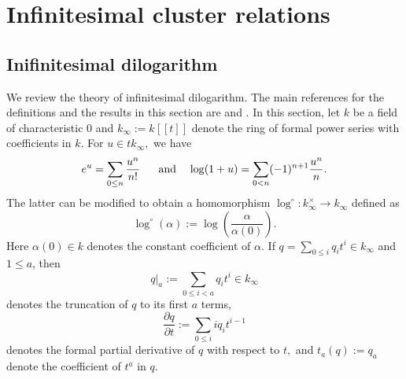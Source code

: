 \documentclass{amsart}
\theoremstyle{definition}
\numberwithin{equation}{subsection}
\begin{document}
\section{Infinitesimal cluster relations}



\subsection{Inifinitesimal dilogarithm}

We review the theory of infinitesimal dilogarithm. The main references for the definitions and the results in this section are \cite[]{inf-dilog} and \cite{u1}.  In this section, let $k$ be a field of characteristic 0 and $k_{\infty}:=k[[t]]$ denote the ring of formal power series with coefficients in $k.$ For $u \in tk_{\infty},$ we have 
$$
e^{u}=\sum _{0\leq n} \frac{u^n}{n!} \;\;\;\;\;\;{\rm and}\;\;\;\;
\log (1+u)=\sum _{0<n} (-1)^{n+1}\frac{u^n}{n}.
$$  
The latter can be modified to obtain a homomorphism 
$
\log^\circ : k_\infty^\times \to k_\infty
$
defined as 
\[
\log^\circ(\alpha) := \log\left(\frac{\alpha}{\alpha(0)}\right).
\]
Here $\alpha(0) \in k$ denotes the constant coefficient of $\alpha.$ 
If \( q = \sum_{0 \le i} q_i t^i \in k_\infty \) and \( 1 \le a \), then $$
q|_a := \sum_{0 \le i < a} q_i t^i \in k_{\infty}
$$
denotes the truncation of $q$ to its first \( a \) terms, 
\[\frac{\partial q}{\partial t}:=\sum _{0\leq i} iq_{i}t^{i-1}\]
denotes 
the formal partial derivative of $q$ with respect to $t,$  and \( t_a(q) := q_a \) denote the coefficient of $t^a$ in $q.$  
\end{document}

